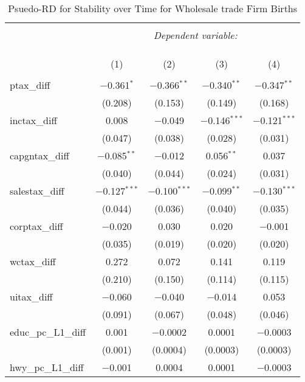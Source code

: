 
\begin{table}[!htbp] \centering 
  \caption{Psuedo-RD for Stability over Time for  Wholesale trade Firm Births} 
  \label{} 
\begin{tabular}{@{\extracolsep{5pt}}lcccc} 
\\[-1.8ex]\hline 
\hline \\[-1.8ex] 
 & \multicolumn{4}{c}{\textit{Dependent variable:}} \\ 
\cline{2-5} 
\\[-1.8ex] & \multicolumn{4}{c}{ } \\ 
\\[-1.8ex] & (1) & (2) & (3) & (4)\\ 
\hline \\[-1.8ex] 
 ptax\_diff & $-$0.361$^{*}$ & $-$0.366$^{**}$ & $-$0.340$^{**}$ & $-$0.347$^{**}$ \\ 
  & (0.208) & (0.153) & (0.149) & (0.168) \\ 
  inctax\_diff & 0.008 & $-$0.049 & $-$0.146$^{***}$ & $-$0.121$^{***}$ \\ 
  & (0.047) & (0.038) & (0.028) & (0.031) \\ 
  capgntax\_diff & $-$0.085$^{**}$ & $-$0.012 & 0.056$^{**}$ & 0.037 \\ 
  & (0.040) & (0.044) & (0.024) & (0.031) \\ 
  salestax\_diff & $-$0.127$^{***}$ & $-$0.100$^{***}$ & $-$0.099$^{**}$ & $-$0.130$^{***}$ \\ 
  & (0.044) & (0.036) & (0.040) & (0.035) \\ 
  corptax\_diff & $-$0.020 & 0.030 & 0.020 & $-$0.001 \\ 
  & (0.035) & (0.019) & (0.020) & (0.020) \\ 
  wctax\_diff & 0.272 & 0.072 & 0.141 & 0.119 \\ 
  & (0.210) & (0.150) & (0.114) & (0.115) \\ 
  uitax\_diff & $-$0.060 & $-$0.040 & $-$0.014 & 0.053 \\ 
  & (0.091) & (0.067) & (0.048) & (0.046) \\ 
  educ\_pc\_L1\_diff & 0.001 & $-$0.0002 & 0.0001 & $-$0.0003 \\ 
  & (0.001) & (0.0004) & (0.0003) & (0.0003) \\ 
  hwy\_pc\_L1\_diff & $-$0.001 & 0.0004 & 0.0001 & $-$0.0003 \\ 

\end{tabular}
\end{table}
